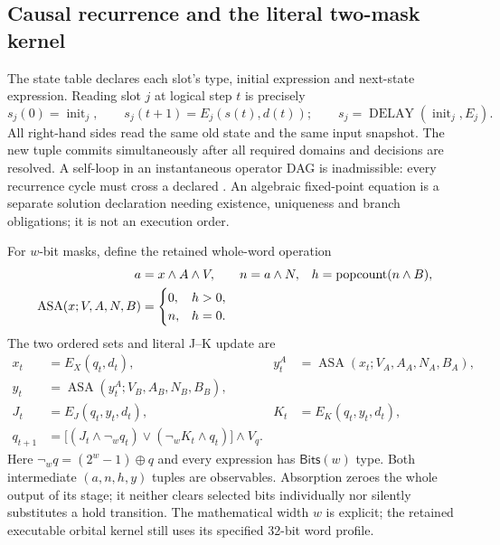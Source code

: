 \subsection{Causal recurrence and the literal two-mask kernel}
The state table declares each slot's type, initial expression and next-state
expression. Reading slot $j$ at logical step $t$ is precisely
\[
 s_j(0)=\operatorname{init}_j,\qquad
 s_j(t+1)=E_j(s(t),d(t));
 \qquad s_j=\operatorname{DELAY}(\operatorname{init}_j,E_j).
\]
All right-hand sides read the same old state and the same input snapshot. The
new tuple commits simultaneously after all required domains and decisions are
resolved. A self-loop in an instantaneous operator DAG is inadmissible: every
recurrence cycle must cross a declared . An algebraic fixed-point
equation is a separate solution declaration needing existence, uniqueness
and branch obligations; it is not an execution order.

For $w$-bit masks, define the retained whole-word operation
\begin{align*}
 a&=x\land A\land V,& n&=a\land N,& h&=\operatorname{popcount}(n\land B),\\
 \operatorname{ASA}(x;V,A,N,B)&=
 \begin{cases}0,&h>0,\\n,&h=0.\end{cases}
\end{align*}
The two ordered sets and literal J--K update are
\begin{align*}
 x_t&=E_X(q_t,d_t),&
 y_t^{A}&=\operatorname{ASA}(x_t;V_A,A_A,N_A,B_A),\\
 y_t&=\operatorname{ASA}(y_t^{A};V_B,A_B,N_B,B_B),\\
 J_t&=E_J(q_t,y_t,d_t),& K_t&=E_K(q_t,y_t,d_t),\\
 q_{t+1}&=\bigl[(J_t\land\neg_w q_t)
       \lor(\neg_w K_t\land q_t)\bigr]\land V_q.
\end{align*}
Here $\neg_w q=(2^w-1)\mathbin{\oplus}q$ and every expression has
$\mathsf{Bits}(w)$ type. Both intermediate $(a,n,h,y)$ tuples are observables.
Absorption zeroes the whole output of its stage; it neither clears selected bits
individually nor silently substitutes a hold transition. The mathematical width
$w$ is explicit; the retained executable orbital kernel still uses its specified
32-bit word profile.

